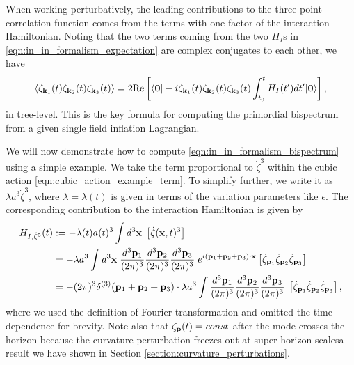 When working perturbatively, the leading contributions to the three-point correlation function comes from the terms with one factor of the interaction Hamiltonian. Noting that the two terms coming from the two $H_I$s in \eqref{eqn:in_in_formalism_expectation} are complex conjugates to each other, we have
\begin{align}
	\left< \zeta_{\mathbf{k}_1}(t) \zeta_{\mathbf{k}_2}(t) \zeta_{\mathbf{k}_3}(t) \right> = 2 \text{Re}\left[ \langle\mathbf{0}| -i \zeta_{\mathbf{k}_1}(t) \zeta_{\mathbf{k}_2}(t) \zeta_{\mathbf{k}_3}(t) \int_{t_0}^{t} H_I(t') dt' |\mathbf{0}\rangle \right], \label{eqn:in_in_formalism_bispectrum}
\end{align}
in tree-level. This is the key formula for computing the primordial bispectrum from a given single field inflation Lagrangian.

We will now demonstrate how to compute \eqref{eqn:in_in_formalism_bispectrum} using a simple example. We take the term proportional to $\dot\zeta^3$ within the cubic action \eqref{eqn:cubic_action_example_term}. To simplify further, we write it as $\lambda a^3 \dot{\zeta}^3$, where $\lambda=\lambda(t)$ is given in terms of the variation parameters like $\epsilon$. The corresponding contribution to the interaction Hamiltonian is given by
\begin{align}
	H_{I,\dot{\zeta}^3}(t) &:= -\lambda(t) a(t)^3 \int d^3\mathbf{x} \; \left[  \dot{\zeta}(\mathbf{x},t)^3 \right]  \\
	&= -\lambda a^3 \int d^3\mathbf{x} \; \frac{d^3\mathbf{p}_1}{(2\pi)^3} \frac{d^3\mathbf{p}_2}{(2\pi)^3} \frac{d^3\mathbf{p}_3}{(2\pi)^3} \; e^{i(\mathbf{p}_1 + \mathbf{p}_2 + \mathbf{p}_3)\cdot\mathbf{x}} \left[ \dot{\zeta}_{\mathbf{p}_1} \dot{\zeta}_{\mathbf{p}_2} \dot{\zeta}_{\mathbf{p}_3} \right] \\
	&= - (2\pi)^3 \delta^{(3)}(\mathbf{p}_1 + \mathbf{p}_2 + \mathbf{p}_3) \cdot \lambda a^3 \int \frac{d^3\mathbf{p}_1}{(2\pi)^3} \frac{d^3\mathbf{p}_2}{(2\pi)^3} \frac{d^3\mathbf{p}_3}{(2\pi)^3} \; \left[ \dot{\zeta}_{\mathbf{p}_1} \dot{\zeta}_{\mathbf{p}_2} \dot{\zeta}_{\mathbf{p}_3} \right], \label{def:interaction_hamiltonian_zeta_dot_cube}
\end{align}
where we used the definition of Fourier transformation and omitted the time dependence for brevity. Note also that $\zeta_{\mathbf{p}}(t) = const$ after the mode crosses the horizon because the curvature perturbation freezes out at super-horizon scales\textemdash a result we have shown in Section \ref{section:curvature_perturbations}.

